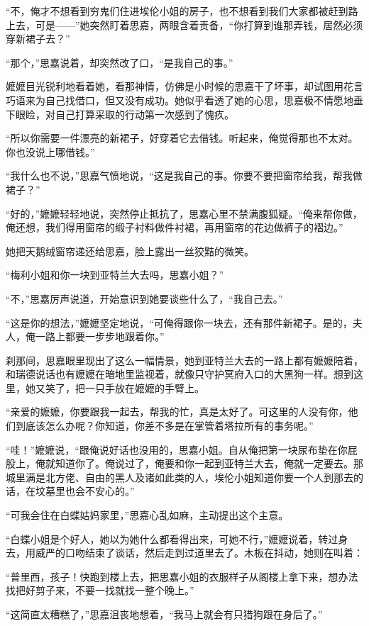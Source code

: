 \par “不，俺才不想看到穷鬼们住进埃伦小姐的房子，也不想看到我们大家都被赶到路上去，可是——”她突然盯着思嘉，两眼含着责备，“你打算到谁那弄钱，居然必须穿新裙子去？”
\par “那个，”思嘉说着，却突然改了口，“是我自己的事。”
\par 嬷嬷目光锐利地看着她，看那神情，仿佛是小时候的思嘉干了坏事，却试图用花言巧语来为自己找借口，但又没有成功。她似乎看透了她的心思，思嘉极不情愿地垂下眼睑，对自己打算采取的行动第一次感到了愧疚。
\par “所以你需要一件漂亮的新裙子，好穿着它去借钱。听起来，俺觉得那也不太对。你也没说上哪借钱。”
\par “我什么也不说，”思嘉气愤地说，“这是我自己的事。你要不要把窗帘给我，帮我做裙子？”
\par “好的，”嬷嬷轻轻地说，突然停止抵抗了，思嘉心里不禁满腹狐疑。“俺来帮你做，俺还想，我们得用窗帘的缎子衬料做件衬裙，再用窗帘的花边做裤子的褶边。”
\par 她把天鹅绒窗帘递还给思嘉，脸上露出一丝狡黠的微笑。
\par “梅利小姐和你一块到亚特兰大去吗，思嘉小姐？”
\par “不，”思嘉厉声说道，开始意识到她要谈些什么了，“我自己去。”
\par “这是你的想法，”嬷嬷坚定地说，“可俺得跟你一块去，还有那件新裙子。是的，夫人，俺一路上都要一步步地跟着你。”
\par 刹那间，思嘉眼里现出了这么一幅情景，她到亚特兰大去的一路上都有嬷嬷陪着，和瑞德说话也有嬷嬷在暗地里监视着，就像只守护冥府入口的大黑狗一样。想到这里，她又笑了，把一只手放在嬷嬷的手臂上。
\par “亲爱的嬷嬷，你要跟我一起去，帮我的忙，真是太好了。可这里的人没有你，他们到底该怎么办呢？你知道，你差不多是在掌管着塔拉所有的事务呢。”
\par “哇！”嬷嬷说，“跟俺说好话也没用的，思嘉小姐。自从俺把第一块尿布垫在你屁股上，俺就知道你了。俺说过了，俺要和你一起到亚特兰大去，俺就一定要去。那城里满是北方佬、自由的黑人及诸如此类的人，埃伦小姐知道你要一个人到那去的话，在坟墓里也会不安心的。”
\par “可我会住在白蝶姑妈家里，”思嘉心乱如麻，主动提出这个主意。
\par “白蝶小姐是个好人，她以为她什么都看得出来，可她不行，”嬷嬷说着，转过身去，用威严的口吻结束了谈话，然后走到过道里去了。木板在抖动，她则在叫着：
\par “普里西，孩子！快跑到楼上去，把思嘉小姐的衣服样子从阁楼上拿下来，想办法找把好剪子来，不要一找就找一整个晚上。”
\par “这简直太糟糕了，”思嘉沮丧地想着，“我马上就会有只猎狗跟在身后了。”
